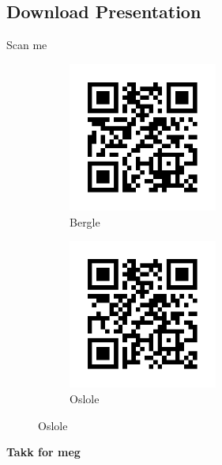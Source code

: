 \subsection*{Download Presentation}
\begin{frame}{Scan me}
    \begin{figure}
        \begin{subfigure}{0.45\textwidth}
            \centering
            \includegraphics[height=4.9cm]{images/bergleqr.png}
            \caption{Bergle}
            \label{fig:qrcodebergle}
        \end{subfigure}
        \hfill
        \begin{subfigure}{0.45\textwidth}
            \centering
            \includegraphics[height=4.9cm]{images/osloleqr.png}
            \caption{Oslole}
            \label{fig:qrcodeoslole}
        \end{subfigure}
    \end{figure}
\end{frame}


\begin{frame}
\begin{center}
\begin{Large}
\textbf{Takk for meg}

\end{Large}
\end{center}  
\end{frame}